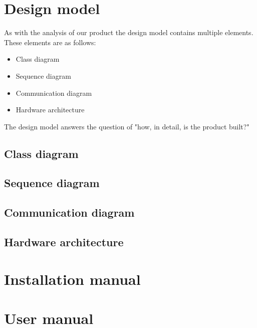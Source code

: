 \documentclass[12pt]{article}
\begin{document}
 	\section{Design model}
 	As with the analysis of our product the design model contains multiple elements. These elements are as follows:
 	\begin{itemize}
 		\item Class diagram
 		\item Sequence diagram
 		\item Communication diagram
 		\item Hardware architecture
 	\end{itemize}
 	The design model answers the question of "how, in detail, is the product built?"
 	\subsection{Class diagram}
 	\subsection{Sequence diagram}
 	\subsection{Communication diagram}
 	\subsection{Hardware architecture}
 	\section{Installation manual}
 	\section{User manual}
\end{document}
